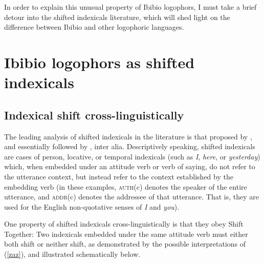 \documentclass[output=paper]{langscibook}
\begin{document}
In order to explain this unusual property of Ibibio logophors, I must take a brief detour into the shifted indexicals literature, which will shed light on the difference between Ibibio and other logophoric languages.



\section{Ibibio logophors as shifted indexicals}


\subsection{Indexical shift cross-linguistically}

The leading analysis of shifted indexicals in the literature is that proposed by \citet{Anand2006}, and essentially followed by \citet{Sudo2012,Shklovsky2014,Deal2017}, {inter alia}. Descriptively speaking, shifted indexicals are cases of person, locative, or temporal indexicals (such as \textit{I}, \textit{here}, or \textit{yesterday}) which, when embedded under an attitude verb or verb of saying, do not refer to the utterance context, but instead refer to the context established by the embedding verb (in these examples, \textsc{auth}(c) denotes the speaker of the entire utterance, and \textsc{addr}(c) denotes the addressee of that utterance. That is, they are used for the English non-quotative senses of \textit{I} and \textit{you}).
\begin{exe}
	\label{zaz}
\end{exe}
One property of shifted indexicals cross-linguistically is that they obey Shift Together: Two indexicals embedded under the same attitude verb must either both shift or neither shift, as demonstrated by the possible interpretations of (\ref{zaz}), and illustrated schematically below.
\end{document}
